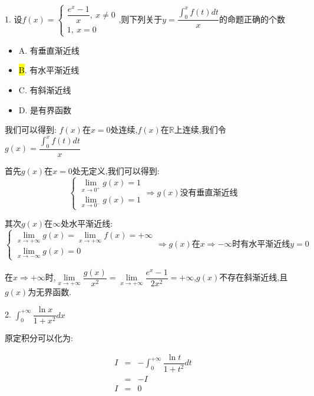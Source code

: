 1. 设$f(x)=\left\lbrace
\begin{array}{l}
	\dfrac{e^x-1}{x},\ x\neq 0\\
	1,\ x=0
\end{array}
\right. $,则下列关于$y=\dfrac{\int_{0}^{x}f(t)dt}{x}$的命题正确的个数
\begin{itemize}
	\item A. 有垂直渐近线
	\item \hl{B}. 有水平渐近线
	\item C. 有斜渐近线
	\item D. 是有界函数
\end{itemize}
\begin{solution}

	我们可以得到:  $f(x)$在$x=0$处连续,$f(x)$在$\mathbb{R}$上连续,我们令$g(x)=\dfrac{\int_{0}^{x}f(t)dt}{x}$
	
	首先$g(x)$在$x=0$处无定义,我们可以得到:  
	$$\left\lbrace
	\begin{array}{l}
		\lim\limits_{x\rightarrow 0^{+}}g(x)=1\\
		\lim\limits_{x\rightarrow 0^{-}}g(x)=1
	\end{array}
	\right. \Rightarrow g(x)\text{没有垂直渐近线}$$
	
	其次$g(x)$在$\infty$处水平渐近线:  
	$$\left\lbrace
	\begin{array}{l}
		\lim\limits_{x\rightarrow+\infty}g(x)=\lim\limits_{x\rightarrow+\infty}f(x)=+\infty\\
		\lim\limits_{x\rightarrow-\infty}g(x)=0
	\end{array}
	\right. \Rightarrow g(x)\text{在}x\Rightarrow -\infty\text{时}\text{有水平渐近线}y=0$$
	
	在$x\Rightarrow +\infty$时,$\lim\limits_{x\rightarrow+\infty}\dfrac{g(x)}{x^2}=\lim\limits_{x\rightarrow +\infty}\dfrac{e^x-1}{2x^2}=+\infty$,$g(x)$不存在斜渐近线,且$g(x)$为无界函数.
	
\end{solution}

2. $\int_{0}^{+\infty}\dfrac{\ln x}{1+x^2}dx$
\begin{solution}

	原定积分可以化为:  

	\begin{eqnarray*}
		I&=&-\int_{0}^{+\infty}\dfrac{\ln t}{1+t^2}dt\\
		&=&-I\\
		I&=&0
	\end{eqnarray*}
\end{solution}

